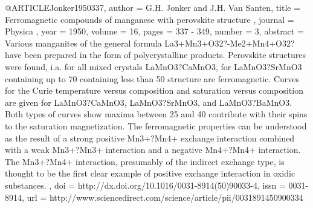@ARTICLE{Jonker1950337,
  author = {G.H. Jonker and J.H. Van Santen},
  title = {Ferromagnetic compounds of manganese with perovskite structure },
  journal = {Physica },
  year = {1950},
  volume = {16},
  pages = {337 - 349},
  number = {3},
  abstract = {Various manganites of the general formula La3+Mn3+O32?-Me2+Mn4+O32?
	have been prepared in the form of polycrystalline products. Perovskite
	structures were found, i.a. for all mixed crystals LaMnO3?CaMnO3,
	for LaMnO3?SrMnO3 containing up to 70%
	containing less than 50%
	structure are ferromagnetic. Curves for the Curie temperature versus
	composition and saturation versus composition are given for LaMnO3?CaMnO3,
	LaMnO3?SrMnO3, and LaMnO3?BaMnO3. Both types of curves show maxima
	between 25 and 40%
	contribute with their spins to the saturation magnetization. The
	ferromagnetic properties can be understood as the result of a strong
	positive Mn3+?Mn4+ exchange interaction combined with a weak Mn3+?Mn3+
	interaction and a negative Mn4+?Mn4+ interaction. The Mn3+?Mn4+ interaction,
	presumably of the indirect exchange type, is thought to be the first
	clear example of positive exchange interaction in oxidic substances.
	},
  doi = {http://dx.doi.org/10.1016/0031-8914(50)90033-4},
  issn = {0031-8914},
  url = {http://www.sciencedirect.com/science/article/pii/0031891450900334}
}

